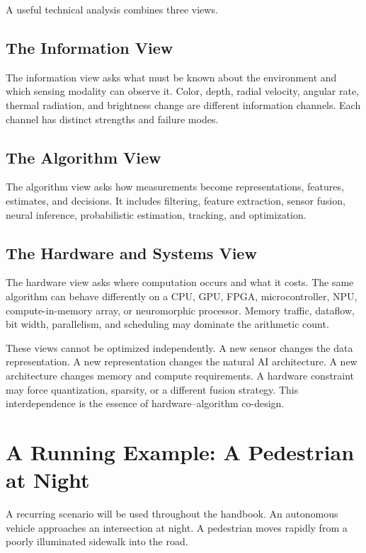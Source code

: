 A useful technical analysis combines three views.

\subsection{The Information View}

The information view asks what must be known about the environment and which sensing modality can observe it. Color, depth, radial velocity, angular rate, thermal radiation, and brightness change are different information channels. Each channel has distinct strengths and failure modes.

\subsection{The Algorithm View}

The algorithm view asks how measurements become representations, features, estimates, and decisions. It includes filtering, feature extraction, sensor fusion, neural inference, probabilistic estimation, tracking, and optimization.

\subsection{The Hardware and Systems View}

The hardware view asks where computation occurs and what it costs. The same algorithm can behave differently on a CPU, GPU, FPGA, microcontroller, NPU, compute-in-memory array, or neuromorphic processor. Memory traffic, dataflow, bit width, parallelism, and scheduling may dominate the arithmetic count.

These views cannot be optimized independently. A new sensor changes the data representation. A new representation changes the natural AI architecture. A new architecture changes memory and compute requirements. A hardware constraint may force quantization, sparsity, or a different fusion strategy. This interdependence is the essence of hardware--algorithm co-design.

\section{A Running Example: A Pedestrian at Night}

A recurring scenario will be used throughout the handbook. An autonomous vehicle approaches an intersection at night. A pedestrian moves rapidly from a poorly illuminated sidewalk into the road.


